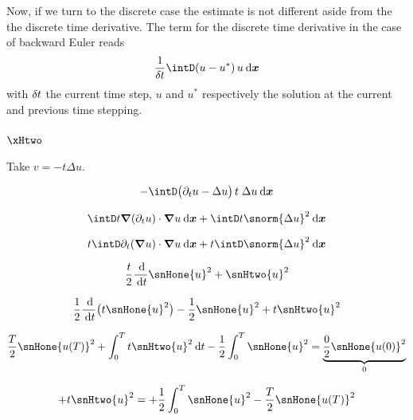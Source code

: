 \medskip
Now, if we turn to the discrete case the estimate is not different aside from the the discrete time derivative.
The term for the discrete time derivative in the case of backward Euler reads
\begin{equation*}
\dfrac{1}{\kt}\intD (u - u^\ast)\, u \dxx
\end{equation*}
with $\delta \hspace{-0.05ex} t$ the current time step, $u$ and $u^\ast$ respectively the solution at the current and previous time stepping.

\subsubsection{$\xHtwo$}

Take $v = - t \Delta u$.

\begin{equation*}
- \intD \bigl(\partial_t u - \Delta u\bigr)\,t\;\Delta u \dxx
\end{equation*}


\begin{equation*}
\intD t \Grad(\partial_t u)\cdot\Grad u  \dxx + \intD t \snorm{\Delta u}^2 \dxx
\end{equation*}

\begin{equation*}
t \intD \partial_t(\Grad u)\cdot\Grad u \dxx + t \intD \snorm{\Delta u}^2 \dxx
\end{equation*}

\begin{equation*}
\dfrac{t}{2}\dfrac{\md}{\dt}\snHone{u}^2 + \snHtwo{u}^2
\end{equation*}

\begin{equation*}
\dfrac{1}{2}\dfrac{\md}{\dt}\bigl(t \snHone{u}^2\bigr) - \dfrac{1}{2} \snHone{u}^2 + t\snHtwo{u}^2
\end{equation*}

\begin{equation*}
\dfrac{T}{2}\snHone{u(T)}^2 + \int_0^T t\snHtwo{u}^2 \dt - \dfrac{1}{2}\int_0^T \snHone{u}^2 = \underbrace{\dfrac{0}{2}\snHone{u(0)}^2}_{0}
\end{equation*}

\begin{equation*}
+ t\snHtwo{u}^2 = + \dfrac{1}{2}\int_0^T \snHone{u}^2 - \dfrac{T}{2}\snHone{u(T)}^2
\end{equation*}























